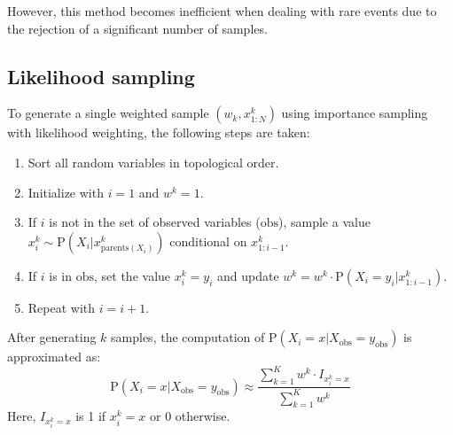 However, this method becomes inefficient when dealing with rare events due to the rejection of a significant number of samples.

\subsection{Likelihood sampling}
To generate a single weighted sample $(w_k,x_{1:N}^k)$ using importance sampling with likelihood weighting, the following steps are taken:
\begin{enumerate}
    \item Sort all random variables in topological order. 
    \item Initialize with $i=1$ and $w^k=1$.
    \item If $i$ is not in the set of observed variables ($\text{obs}$), sample a value $x_i^k \sim \text{P}\left(X_i|x_{\text{parents}(X_i)}^k\right)$ conditional on $x^k_{1:i-1}$. 
    \item If $i$ is in $\text{obs}$, set the value $x_i^k =y_i$ and update $w^k=w^k\cdot\text{P}\left( X_i=y_i|x^k_{1:i-1} \right)$.
    \item Repeat with $i=i+1$.
\end{enumerate}
After generating $k$ samples, the computation of $\text{P}\left(X_i=x|X_{\text{obs}}=y_{\text{obs}}\right)$ is approximated as:
\[\text{P}\left(X_i=x|X_{\text{obs}}=y_{\text{obs}}\right) \approx \dfrac{\sum_{k=1}^Kw^k\cdot I_{x_i^k=x}}{\sum_{k=1}^Kw^k}\]
Here, $I_{x_i^k=x}$ is 1 if $x_i^k=x$ or 0 otherwise. 

